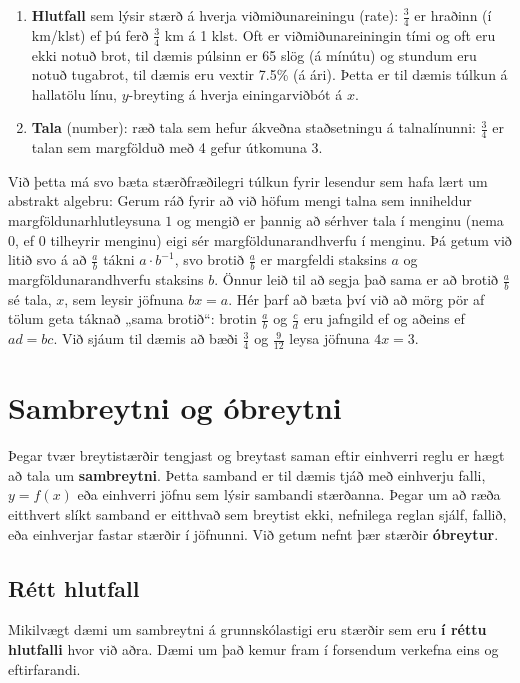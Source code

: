\documentclass[
  icelandic,
]{book}
\theoremstyle{definition}
\theoremstyle{definition}
\theoremstyle{definition}
\theoremstyle{definition}
\theoremstyle{remark}
\begin{document}
\begin{enumerate}
\item
  \textbf{Hlutfall} sem lýsir stærð á hverja viðmiðunareiningu (rate): \(\frac{3}{4}\) er hraðinn (í km/klst) ef þú ferð \(\frac{3}{4}\) km á 1 klst. Oft er viðmiðunareiningin tími og oft eru ekki notuð brot, til dæmis púlsinn er 65 slög (á mínútu) og stundum eru notuð tugabrot, til dæmis eru vextir 7.5\% (á ári). Þetta er til dæmis túlkun á hallatölu línu, \(y\)-breyting á hverja einingarviðbót á \(x\).
\item
  \textbf{Tala} (number): ræð tala sem hefur ákveðna staðsetningu á talnalínunni: \(\frac{3}{4}\) er talan sem margfölduð með 4 gefur útkomuna 3.
\end{enumerate}

Við þetta má svo bæta stærðfræðilegri túlkun fyrir lesendur sem hafa lært um abstrakt algebru: Gerum ráð fyrir að við höfum mengi talna sem inniheldur margföldunarhlutleysuna \(1\) og mengið er þannig að sérhver tala í menginu (nema \(0\), ef \(0\) tilheyrir menginu) eigi sér margföldunarandhverfu í menginu. Þá getum við litið svo á að \(\frac{a}{b}\) tákni \(a\cdot b^{-1}\), svo brotið \(\frac{a}{b}\) er margfeldi staksins \(a\) og margföldunarandhverfu staksins \(b\). Önnur leið til að segja það sama er að brotið \(\frac{a}{b}\) sé tala, \(x\), sem leysir jöfnuna \(bx=a\). Hér þarf að bæta því við að mörg pör af tölum geta táknað „sama brotið``: brotin \(\frac{a}{b}\) og \(\frac{c}{d}\) eru jafngild ef og aðeins ef \(ad=bc\). Við sjáum til dæmis að bæði \(\frac{3}{4}\) og \(\frac{9}{12}\) leysa jöfnuna \(4x=3\).

\section{Sambreytni og óbreytni}\label{sambreytni-obreytni}

Þegar tvær breytistærðir tengjast og breytast saman eftir einhverri reglu er hægt að tala um \textbf{sambreytni}. Þetta samband er til dæmis tjáð með einhverju falli, \(y=f(x)\) eða einhverri jöfnu sem lýsir sambandi stærðanna. Þegar um að ræða eitthvert slíkt samband er eitthvað sem breytist ekki, nefnilega reglan sjálf, fallið, eða einhverjar fastar stærðir í jöfnunni. Við getum nefnt þær stærðir \textbf{óbreytur}.

\subsection{Rétt hlutfall}\label{rett-hlutfall}

Mikilvægt dæmi um sambreytni á grunnskólastigi eru stærðir sem eru \textbf{í réttu hlutfalli} hvor við aðra. Dæmi um það kemur fram í forsendum verkefna eins og eftirfarandi.
\end{document}
